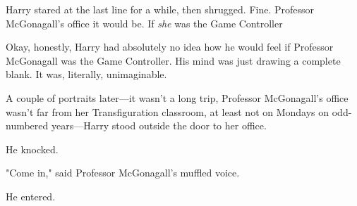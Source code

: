 Harry stared at the last line for a while, then shrugged. Fine. Professor
McGonagall's office it would be. If \emph{she} was the Game Controller{\el}

Okay, honestly, Harry had absolutely no idea how he would feel if Professor
McGonagall was the Game Controller. His mind was just drawing a complete blank.
It was, literally, unimaginable.

A couple of portraits later---it wasn't a long trip, Professor McGonagall's
office wasn't far from her Transfiguration classroom, at least not on Mondays
on odd-numbered years---Harry stood outside the door to her office.

He knocked.

"Come in," said Professor McGonagall's muffled voice.

He entered.
